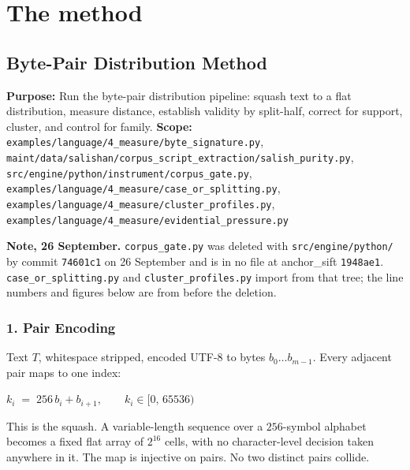 \chapter{The method}

\section{Byte-Pair Distribution Method}

\textbf{Purpose:} Run the byte-pair distribution pipeline: squash text to a flat distribution, measure distance, establish validity by split-half, correct for support, cluster, and control for family. \textbf{Scope:} \texttt{examples/\allowbreak{}language/\allowbreak{}4\_\allowbreak{}measure/\allowbreak{}byte\_\allowbreak{}signature.\allowbreak{}py}, \texttt{maint/\allowbreak{}data/\allowbreak{}salishan/\allowbreak{}corpus\_\allowbreak{}script\_\allowbreak{}extraction/\allowbreak{}salish\_\allowbreak{}purity.\allowbreak{}py}, \texttt{src/\allowbreak{}engine/\allowbreak{}python/\allowbreak{}instrument/\allowbreak{}corpus\_\allowbreak{}gate.\allowbreak{}py}, \texttt{examples/\allowbreak{}language/\allowbreak{}4\_\allowbreak{}measure/\allowbreak{}case\_\allowbreak{}or\_\allowbreak{}splitting.\allowbreak{}py}, \texttt{examples/\allowbreak{}language/\allowbreak{}4\_\allowbreak{}measure/\allowbreak{}cluster\_\allowbreak{}profiles.\allowbreak{}py}, \texttt{examples/\allowbreak{}language/\allowbreak{}4\_\allowbreak{}measure/\allowbreak{}evidential\_\allowbreak{}pressure.\allowbreak{}py}

\textbf{Note, 26 September.} \texttt{corpus\_\allowbreak{}gate.\allowbreak{}py} was deleted with \texttt{src/\allowbreak{}engine/\allowbreak{}python/} by commit \texttt{74601c1} on 26 September and is in no file at anchor\_sift \texttt{1948ae1}. \texttt{case\_\allowbreak{}or\_\allowbreak{}splitting.\allowbreak{}py} and \texttt{cluster\_\allowbreak{}profiles.\allowbreak{}py} import from that tree; the line numbers and figures below are from before the deletion.

\subsection{1. Pair Encoding}

Text \(T\), whitespace stripped, encoded UTF-8 to bytes \(b_0 \dots b_{m-1}\). Every adjacent pair maps to one index:

\(k_i \;=\; 256\,b_i + b_{i+1}, \qquad k_i \in [0,\,65536)\)

This is the squash. A variable-length sequence over a \(256\)-symbol alphabet becomes a fixed flat array of \(2^{16}\) cells, with no character-level decision taken anywhere in it. The map is injective on pairs. No two distinct pairs collide.

